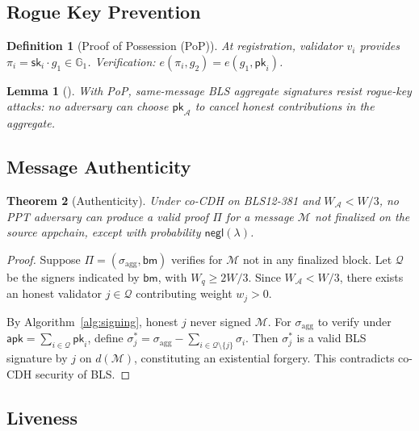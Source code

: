\documentclass[11pt,a4paper]{article}
\newtheorem{theorem}{Theorem}
\newtheorem{lemma}[theorem]{Lemma}
\newtheorem{definition}{Definition}
\begin{document}
\subsection{Rogue Key Prevention}

\begin{definition}[Proof of Possession (PoP)]
At registration, validator $v_i$ provides $\pi_i = \mathsf{sk}_i \cdot g_1 \in \mathbb{G}_1$. Verification: $e(\pi_i, g_2) = e(g_1, \mathsf{pk}_i)$.
\end{definition}

\begin{lemma}[\cite{ristenpart2007power}]
With PoP, same-message BLS aggregate signatures resist rogue-key attacks: no adversary can choose $\mathsf{pk}_{\mathcal{A}}$ to cancel honest contributions in the aggregate.
\end{lemma}

\subsection{Message Authenticity}

\begin{theorem}[Authenticity]\label{thm:auth}
Under co-CDH on BLS12-381 and $W_{\mathcal{A}} < W/3$, no PPT adversary can produce a valid proof $\Pi$ for a message $\mathcal{M}$ not finalized on the source appchain, except with probability $\mathsf{negl}(\lambda)$.
\end{theorem}

\begin{proof}
Suppose $\Pi = (\sigma_{\text{agg}}, \mathsf{bm})$ verifies for $\mathcal{M}$ not in any finalized block. Let $\mathcal{Q}$ be the signers indicated by $\mathsf{bm}$, with $W_q \geq 2W/3$. Since $W_{\mathcal{A}} < W/3$, there exists an honest validator $j \in \mathcal{Q}$ contributing weight $w_j > 0$.

By Algorithm~\ref{alg:signing}, honest $j$ never signed $\mathcal{M}$. For $\sigma_{\text{agg}}$ to verify under $\mathsf{apk} = \sum_{i \in \mathcal{Q}} \mathsf{pk}_i$, define $\sigma_j^* = \sigma_{\text{agg}} - \sum_{i \in \mathcal{Q} \setminus \{j\}} \sigma_i$. Then $\sigma_j^*$ is a valid BLS signature by $j$ on $d(\mathcal{M})$, constituting an existential forgery. This contradicts co-CDH security of BLS.
\end{proof}

\subsection{Liveness}
\end{document}
